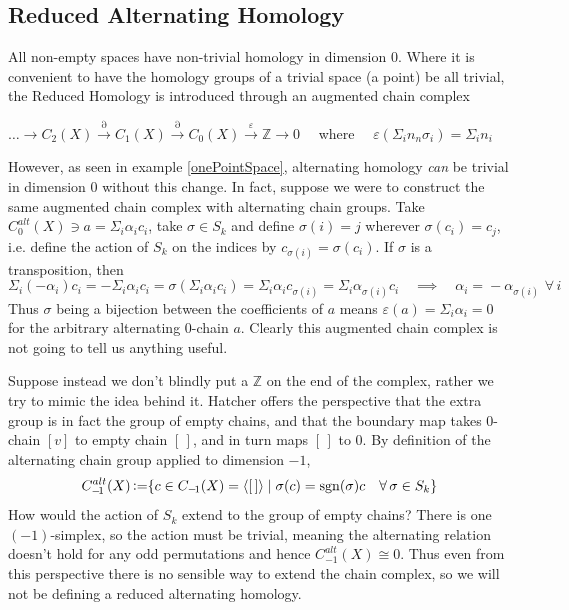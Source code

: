 \documentclass[11pt,a4paper,twoside]{article}
\theoremstyle{plain}
\theoremstyle{definition}
\theoremstyle{definition}
\theoremstyle{definition}
\theoremstyle{definition}
\theoremstyle{definition}
\DeclareMathOperator{\sgn}{sgn}
\DeclareMathOperator{\coloneqq}{\vcentcolon=}
\begin{document}
\subsection{Reduced Alternating Homology}
\label{Sec_AlternatingReducedHomology}
All non-empty spaces have non-trivial homology in dimension 0. Where it is convenient to have the homology groups of a trivial space (a point) be all trivial, the Reduced Homology is introduced through an augmented chain complex\\
\begin{center}$\dots\longrightarrow C_2(X)\overset\partial\longrightarrow C_1(X)\overset\partial\longrightarrow C_0(X)\overset\varepsilon\longrightarrow\mathbb{Z}\longrightarrow 0\quad$ where $\quad \varepsilon(\Sigma_in_n\sigma_i)=\Sigma_in_i$\end{center}
However, as seen in example \ref{onePointSpace}, alternating homology \emph{can} be trivial in dimension $0$ without this change. In fact, suppose we were to construct the same augmented chain complex with alternating chain groups. Take $C_0^{alt}(X)\ni a\!=\! \Sigma_i\alpha_ic_i$, take $\sigma\in S_k$ and define $\sigma(i)=j$ wherever $\sigma(c_i)=c_j$, i.e. define the action of $S_k$ on the indices by $c_{\sigma(i)}=\sigma(c_i)$. If $\sigma$ is a transposition, then
$$\Sigma_i(-\alpha_i)c_i=-\Sigma_i\alpha_ic_i=\sigma(\Sigma_i\alpha_ic_i)=\Sigma_i\alpha_ic_{\sigma(i)}=\Sigma_i\alpha_{\sigma(i)}c_i\quad\implies\quad\alpha_i\!=\!-\alpha_{\sigma(i)}\,\,\forall\,i$$
Thus $\sigma$ being a bijection between the coefficients of $a$ means $\varepsilon(a)=\Sigma_i\alpha_i=0$ for the arbitrary alternating $0$-chain $a$. Clearly this augmented chain complex is not going to tell us anything useful.

Suppose instead we don't blindly put a $\mathbb{Z}$ on the end of the complex, rather we try to mimic the idea behind it. Hatcher offers the perspective that the extra group is in fact the group of empty chains, and that the boundary map takes $0$-chain $[v]$ to empty chain $[\,]$, and in turn maps $[\,]$ to $0$. By definition of the alternating chain group applied to dimension $-\!1$,
$$C_{-\!1}^{alt}(X)\coloneqq\{c\in C_{-\!1}(X)=\langle[\,]\rangle\mid \sigma(c)=\sgn(\sigma)c\quad\forall\,\sigma\in S_k\}$$
How would the action of $S_k$ extend to the group of empty chains? There is one $(-\!1)$-simplex, so the action must be trivial, meaning the alternating relation doesn't hold for any odd permutations and hence $C_{-\!1}^{alt}(X)\cong0$. Thus even from this perspective there is no sensible way to extend the chain complex, so we will not be defining a reduced alternating homology.
\end{document}
